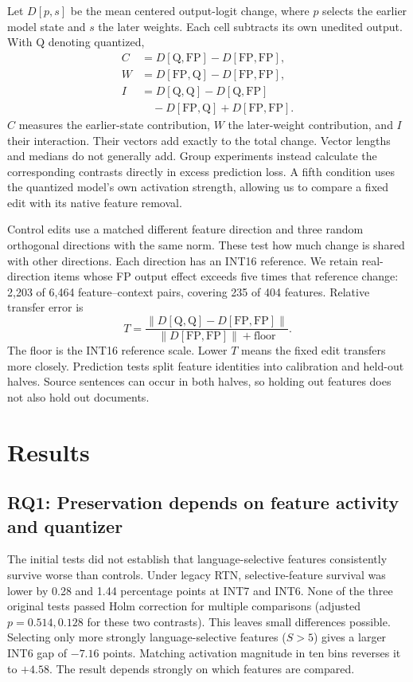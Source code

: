 \documentclass[11pt]{article}
\newcommand{\FP}{\mathrm{FP}}
\newcommand{\Q}{\mathrm{Q}}
\begin{document}
Let $D[p,s]$ be the mean centered output-logit change, where $p$ selects the earlier model state and $s$ the later weights. Each cell subtracts its own unedited output. With Q denoting quantized,
\begin{align}
 C&=D[\Q,\FP]-D[\FP,\FP],\\
 W&=D[\FP,\Q]-D[\FP,\FP],\\
 I&=D[\Q,\Q]-D[\Q,\FP]\nonumber\\
  &\quad-D[\FP,\Q]+D[\FP,\FP].
\end{align}
$C$ measures the earlier-state contribution, $W$ the later-weight contribution, and $I$ their interaction. Their vectors add exactly to the total change. Vector lengths and medians do not generally add. Group experiments instead calculate the corresponding contrasts directly in excess prediction loss. A fifth condition uses the quantized model's own activation strength, allowing us to compare a fixed edit with its native feature removal.

Control edits use a matched different feature direction and three random orthogonal directions with the same norm. These test how much change is shared with other directions. Each direction has an INT16 reference. We retain real-direction items whose FP output effect exceeds five times that reference change: 2,203 of 6,464 feature--context pairs, covering 235 of 404 features. Relative transfer error is
\begin{equation}
 T=\frac{\|D[\Q,\Q]-D[\FP,\FP]\|}{\|D[\FP,\FP]\|+\mathrm{floor}}.
\end{equation}
The floor is the INT16 reference scale. Lower $T$ means the fixed edit transfers more closely. Prediction tests split feature identities into calibration and held-out halves. Source sentences can occur in both halves, so holding out features does not also hold out documents.

\section{Results}
\subsection{RQ1: Preservation depends on feature activity and quantizer}
The initial tests did not establish that language-selective features consistently survive worse than controls. Under legacy RTN, selective-feature survival was lower by 0.28 and 1.44 percentage points at INT7 and INT6. None of the three original tests passed Holm correction for multiple comparisons (adjusted $p=0.514,0.128$ for these two contrasts). This leaves small differences possible. Selecting only more strongly language-selective features ($S>5$) gives a larger INT6 gap of $-7.16$ points. Matching activation magnitude in ten bins reverses it to $+4.58$. The result depends strongly on which features are compared.
\end{document}
